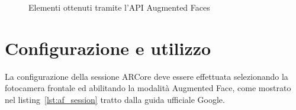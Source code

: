 \documentclass[crop=false, class=book]{standalone}
\begin{document}
	\begin{figure}
		\centering
			  \quad
			 \quad
		\caption{Elementi ottenuti tramite l'API Augmented Faces}
		\label{fig:augm_faces}
	\end{figure}
	
	\section{Configurazione e utilizzo}
	La configurazione della sessione ARCore deve essere effettuata selezionando la fotocamera frontale ed abilitando la modalità Augmented Face, come mostrato nel listing~\vref{lst:af_session} tratto dalla guida ufficiale Google.
\end{document}
